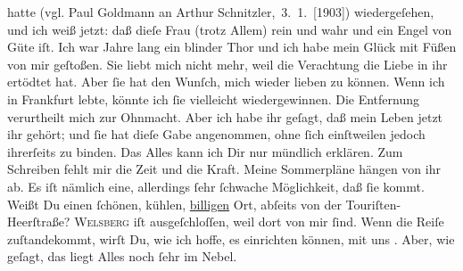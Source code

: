 \begin{ledgroupsized}[t]{13cm}
{{{                  hatte (vgl. Paul Goldmann an Arthur Schnitzler, 3. 1. [1903])}}}\label{K_L03377-1h}
               wiedergeſehen, und ich weiß jetzt: daß dieſe Frau (trotz Allem) rein und wahr und ein Engel von Güte iſt.
               Ich war Jahre lang ein blinder Thor und ich habe mein Glück mit Füßen von mir
               geſtoßen. Sie liebt mich nicht mehr, weil die Verachtung die Liebe in ihr ertödtet
               hat. Aber ſie hat den Wunſch, mich wieder lieben zu können. Wenn ich in Frankfurt lebte, könnte ich ſie vielleicht
               wiedergewinnen. Die Entfernung verurtheilt mich zur Ohnmacht. Aber ich habe  ihr geſagt, daß mein Leben jetzt ihr gehört; und ſie
               hat dieſe Gabe angenommen, ohne ſich einſtweilen jedoch ihrerſeits zu {\pb}binden. Das Alles kann ich Dir nur mündlich
               erklären. Zum Schreiben fehlt mir die Zeit und die Kraft.\pend
           \pstart
           Meine Sommerpläne hängen von ihr ab. Es iſt nämlich eine, allerdings ſehr ſchwache Möglichkeit, daß ſie
                  \label{K_L03377-2v}\label{K_L03377-2h} kommt. Weißt
               Du einen ſchönen, kühlen, \uline{billigen} Ort, abſeits von
               der Touriſten-Heerſtraße? \textsc{Welsberg} iſt ausgeſchloſſen, weil dort \label{K_L03377-3v}\label{K_L03377-3h}
               von mir ſind. Wenn die Reiſe zuſtandekommt, wirſt Du, wie ich hoffe, es einrichten
               können, mit uns \label{K_L03377-4v}\label{K_L03377-4h}. Aber, wie geſagt, das liegt Alles noch ſehr im Nebel.\pend

\end{ledgroupsized}
